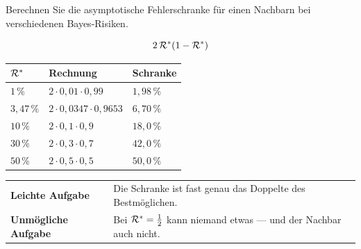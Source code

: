 \begin{aufgabe}
Berechnen Sie die asymptotische Fehlerschranke für einen Nachbarn bei verschiedenen Bayes-Risiken.

\loesung
{}
\[ 2\,\mathcal{R}^{*}(1-\mathcal{R}^{*}) \]

\begin{center}
{\small
\renewcommand{\arraystretch}{1.48}
\begin{tabular}{@{}P{2.4cm}P{3.2cm}P{2.0cm}@{}}
\toprule
$\mathcal{R}^{*}$ & \textbf{Rechnung} & \textbf{Schranke}\\
\midrule
$1\,\%$ & $2\cdot0{,}01\cdot0{,}99$ & $1{,}98\,\%$\\
$3{,}47\,\%$ & $2\cdot0{,}0347\cdot0{,}9653$ & $6{,}70\,\%$\\
$10\,\%$ & $2\cdot0{,}1\cdot0{,}9$ & $18{,}0\,\%$\\
$30\,\%$ & $2\cdot0{,}3\cdot0{,}7$ & $42{,}0\,\%$\\
$50\,\%$ & $2\cdot0{,}5\cdot0{,}5$ & $50{,}0\,\%$\\
\bottomrule
\end{tabular}}
\end{center}


\begin{center}
{\small
\renewcommand{\arraystretch}{1.5}
\begin{tabular}{@{}P{2.4cm}P{6.2cm}@{}}
\toprule
\textbf{Leichte Aufgabe} & Die Schranke ist fast genau das Doppelte des Bestmöglichen.\\
\textbf{Unmögliche Aufgabe} & Bei $\mathcal{R}^{*} = \tfrac12$ kann niemand etwas --- und der Nachbar auch nicht.\\
\bottomrule
\end{tabular}}
\end{center}

\begin{center}
\begin{minipage}{0.88\textwidth}
\end{minipage}
\end{center}
\end{aufgabe}

